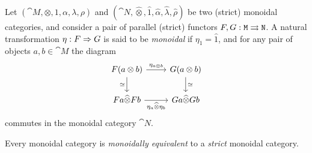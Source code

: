 \documentclass[../../deep-dive]{subfiles}
\begin{document}
\begin{definition}
    \label{def:monoidal-natural-transformation}
    Let \((\cat M, \otimes, 1, \alpha, \lambda, \rho)\) and
    \((\cat N, \widehat\otimes, \widehat 1, \widehat \alpha, \widehat \lambda,
    \widehat \rho)\) be two (strict) monoidal categories, and consider a pair of
    parallel (strict) functors \(F, G: \texttt M \rightrightarrows \texttt N\). A natural
    transformation \(\eta: F \Rightarrow G\) is said to be \emph{monoidal} if
    \(\eta_1 = \widehat 1\), and for any pair of objects \(a, b \in \cat M\) the
    diagram
    \[
        \begin{tikzcd}
            F(a \otimes b) \ar[d, "\dis"']
            \ar[r, "\eta_{a \otimes b}"]
            &G(a \otimes b) \ar[d, "\dis"] \\
            F a \widehat\otimes F b \ar[r, "\eta_a \widehat\otimes \eta_b"']
            &G a \widehat\otimes G b
        \end{tikzcd}
    \]
    commutes in the monoidal category \(\cat N\).
\end{definition}

\begin{theorem}
    \label{thm:strictification-mon-cat}
    Every monoidal category is \emph{monoidally equivalent} to a \emph{strict}
    monoidal category.
\end{theorem}
\end{document}
